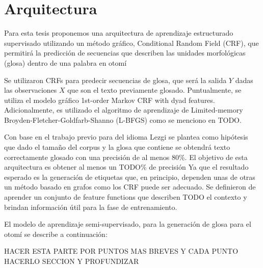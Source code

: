 \documentclass[letterpaper,12pt,oneside]{book}
\begin{document}


\section{Arquitectura}

Para esta tesis proponemos una arquitectura de aprendizaje
estructurado  supervisado utilizando un método gráfico, Conditional
Random Field (CRF), que permitirá la predicción de secuencias que describen
las unidades morfológicas (glosa) dentro de una palabra en otomí

Se utilizaron CRFs para predecir secuencias de glosa, que será la salida $Y$
dadas las observaciones $X$ que son el texto previamente glosado. Puntualmente,
se utiliza el modelo gráfico 1st-order Markov CRF with dyad features.
Adicionalmente, es utilizado el algoritmo de aprendizaje de Limited-memory
Broyden-Fletcher-Goldfarb-Shanno (L-BFGS) como se menciono en TODO.

Con base en el trabajo previo para del idioma Lezgi \citep{moeller2018automatic} se plantea como hipótesis que dado el tamaño del corpus y la glosa que contiene
se obtendrá texto correctamente glosado con una precisión de al menos 80\%. El objetivo de esta arquitectura es obtener al menos un TODO\% de precisión
Ya que el resultado esperado es la generación de etiquetas que, en principio,
dependen unas de otras un método basado en grafos como los CRF puede ser
adecuado. Se definieron de aprender un conjunto de feature functions que
describen TODO el contexto y brindan información útil para la fase de
entrenamiento.

El modelo de aprendizaje semi-supervisado, para la generación de glosa para
el otomí se describe a continuación:

HACER ESTA PARTE POR PUNTOS MAS BREVES Y CADA PUNTO HACERLO SECCION Y PROFUNDIZAR
\end{document}
